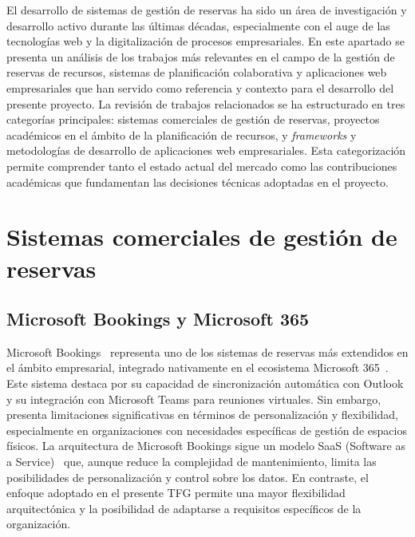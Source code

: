 
El desarrollo de sistemas de gestión de reservas ha sido un área de investigación y desarrollo activo durante las últimas décadas, especialmente con el auge de las tecnologías web y la digitalización de procesos empresariales. En este apartado se presenta un análisis de los trabajos más relevantes en el campo de la gestión de reservas de recursos, sistemas de planificación colaborativa y aplicaciones web empresariales que han servido como referencia y contexto para el desarrollo del presente proyecto.
La revisión de trabajos relacionados se ha estructurado en tres categorías principales: sistemas comerciales de gestión de reservas, proyectos académicos en el ámbito de la planificación de recursos, y \emph{frameworks} y metodologías de desarrollo de aplicaciones web empresariales. Esta categorización permite comprender tanto el estado actual del mercado como las contribuciones académicas que fundamentan las decisiones técnicas adoptadas en el proyecto.\\

\section{Sistemas comerciales de gestión de reservas}\label{sistemas-comerciales-gestion-reservas}
\subsection{Microsoft Bookings y Microsoft 365}\label{microsoft-booking-microsoft-365}
Microsoft Bookings~\cite{microsoft-booking} representa uno de los sistemas de reservas más extendidos en el ámbito empresarial, integrado nativamente en el ecosistema Microsoft 365~\cite{microsoft-365}. Este sistema destaca por su capacidad de sincronización automática con Outlook y su integración con Microsoft Teams para reuniones virtuales. Sin embargo, presenta limitaciones significativas en términos de personalización y flexibilidad, especialmente en organizaciones con necesidades específicas de gestión de espacios físicos.
La arquitectura de Microsoft Bookings sigue un modelo SaaS (Software as a Service)~\cite{saas} que, aunque reduce la complejidad de mantenimiento, limita las posibilidades de personalización y control sobre los datos. En contraste, el enfoque adoptado en el presente TFG permite una mayor flexibilidad arquitectónica y la posibilidad de adaptarse a requisitos específicos de la organización.\\

